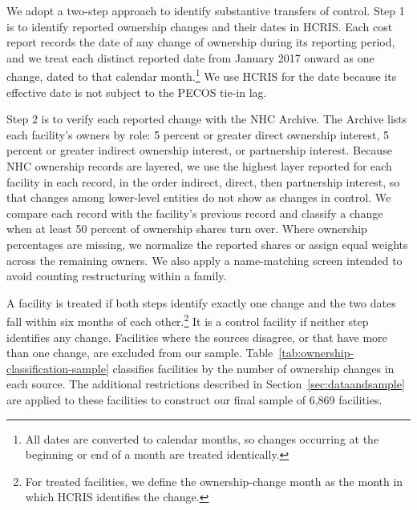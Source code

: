 \documentclass[12pt]{article}
\begin{document}
We adopt a two-step approach to identify substantive transfers of control. Step 1 is to identify reported ownership changes and their dates in HCRIS. Each cost report records the date of any change of ownership during its reporting period, and we treat each distinct reported date from January 2017 onward as one change, dated to that calendar month.\footnote{All dates are converted to calendar months, so changes occurring at the beginning or end of a month are treated identically.} We use HCRIS for the date because its effective date is not subject to the PECOS tie-in lag.

Step 2 is to verify each reported change with the NHC Archive. The Archive lists each facility's owners by role: 5 percent or greater direct ownership interest, 5 percent or greater indirect ownership interest, or partnership interest. Because NHC ownership records are layered, we use the highest layer reported for each facility in each record, in the order indirect, direct, then partnership interest, so that changes among lower-level entities do not show as changes in control. We compare each record with the facility's previous record and classify a change when at least 50 percent of ownership shares turn over. Where ownership percentages are missing, we normalize the reported shares or assign equal weights across the remaining owners. We also apply a name-matching screen intended to avoid counting restructuring within a family.

A facility is treated if both steps identify exactly one change and the two dates fall within six months of each other.\footnote{For treated facilities, we define the ownership-change month as the month in which HCRIS identifies the change.} It is a control facility if neither step identifies any change. Facilities where the sources disagree, or that have more than one change, are excluded from our sample. Table~\ref{tab:ownership-classification-sample} classifies facilities by the number of ownership changes in each source. The additional restrictions described in Section~\ref{sec:dataandsample} are applied to these facilities to construct our final sample of 6,869 facilities.
\end{document}
